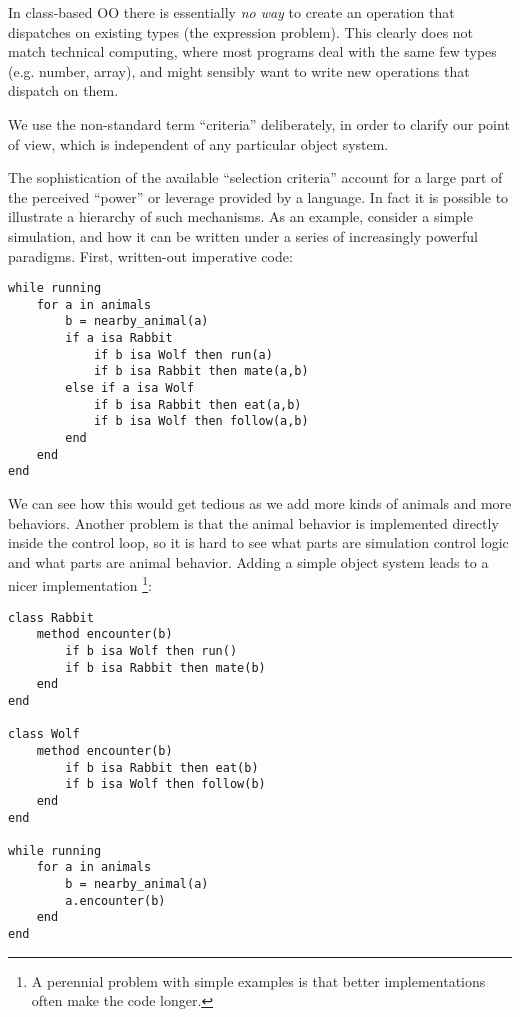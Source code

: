 In class-based OO there is essentially \emph{no way} to create an operation
that dispatches on existing types (the expression problem). This clearly
does not match technical computing, where most programs deal with the same
few types (e.g. number, array), and might sensibly want to write new operations
that dispatch on them.


We use the non-standard term ``criteria'' deliberately, in order
to clarify our point of view, which is independent of any particular
object system.

The sophistication of the available ``selection criteria'' account for a
large part of the perceived ``power'' or leverage provided by a language.
In fact it is possible to illustrate a hierarchy of such mechanisms.
As an example, consider a simple simulation, and how it can be written
under a series of increasingly powerful paradigms. First, written-out
imperative code:

\begin{verbatim}
while running
    for a in animals
        b = nearby_animal(a)
        if a isa Rabbit
            if b isa Wolf then run(a)
            if b isa Rabbit then mate(a,b)
        else if a isa Wolf
            if b isa Rabbit then eat(a,b)
            if b isa Wolf then follow(a,b)
        end
    end
end
\end{verbatim}

We can see how this would get tedious as we add more kinds of animals
and more behaviors. Another problem is that the animal behavior is
implemented directly inside the control loop, so it is hard to see
what parts are simulation control logic and what parts are animal
behavior. Adding a simple object system leads to a nicer implementation
\footnote{A perennial problem with simple examples is that better
implementations often make the code longer.}:

\begin{verbatim}
class Rabbit
    method encounter(b)
        if b isa Wolf then run()
        if b isa Rabbit then mate(b)
    end
end

class Wolf
    method encounter(b)
        if b isa Rabbit then eat(b)
        if b isa Wolf then follow(b)
    end
end

while running
    for a in animals
        b = nearby_animal(a)
        a.encounter(b)
    end
end
\end{verbatim}

